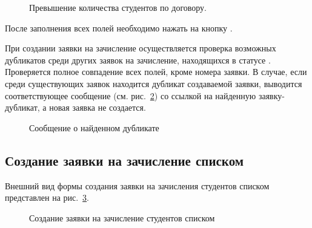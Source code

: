 \begin{figure}[H]
	\caption{Превышение количества студентов по договору.}
	\label{img:student:enroll_req_create_student_error}
\end{figure}

После заполнения всех полей необходимо нажать на кнопку .

При создании заявки на зачисление осуществляется проверка возможных дубликатов среди других заявок на зачисление, 
находящихся в статусе . Проверяется полное совпадение всех полей, кроме номера заявки. 
В случае, если среди существующих заявок находится дубликат создаваемой заявки, выводится соответствующее сообщение 
(см. рис.~\ref{img:student:req_enroll_duplicate_msg}) со ссылкой на найденную заявку-дубликат, 
а новая заявка не создается.

\begin{figure}[H]
	\caption{Сообщение о найденном дубликате}
	\label{img:student:req_enroll_duplicate_msg}
\end{figure}

\subsection{Создание заявки на зачисление списком}
Внешний вид формы создания заявки на зачисления студентов списком представлен 
на рис.~\ref{img:student:mass_enroll_req_create}.

\begin{figure}[H]
	\caption{Создание заявки на зачисление студентов списком}
	\label{img:student:mass_enroll_req_create}
\end{figure}

